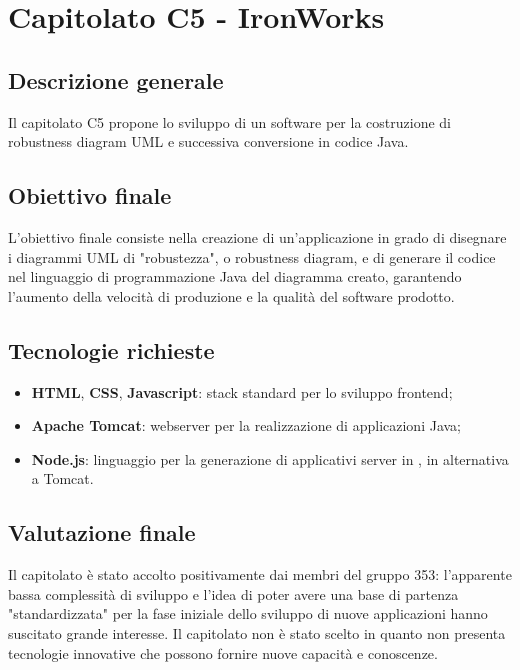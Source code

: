 \documentclass[StudioDiFattibilità.tex]{subfiles}
\begin{document}
\chapter{Capitolato C5 - IronWorks}
\section{Descrizione generale}
Il capitolato C5 propone lo sviluppo di un software
per la costruzione di robustness diagram UML e successiva conversione in codice Java.
\section{Obiettivo finale}
L'obiettivo finale consiste nella creazione di un'applicazione in grado di disegnare i diagrammi UML di "robustezza", o robustness diagram, e di generare il codice nel linguaggio di programmazione Java del diagramma creato, garantendo l'aumento della velocità di produzione e la qualità del software prodotto.
\section{Tecnologie richieste}
\begin{itemize}
	\item \textbf{HTML}, \textbf{CSS}, \textbf{Javascript}: stack standard per lo sviluppo frontend;
	\item \textbf{Apache Tomcat}: webserver per la realizzazione di applicazioni Java;
	\item \textbf{Node.js}: linguaggio per la generazione di applicativi server in , in alternativa a Tomcat.
\end{itemize}
\section{Valutazione finale}
Il capitolato è stato accolto positivamente dai membri del gruppo 353: l'apparente bassa complessità di sviluppo e l'idea di poter avere una base di partenza "standardizzata" per la fase iniziale dello sviluppo di nuove applicazioni hanno suscitato grande interesse. Il capitolato non è stato scelto in quanto non presenta tecnologie innovative che possono fornire nuove capacità e conoscenze.
\end{document}
